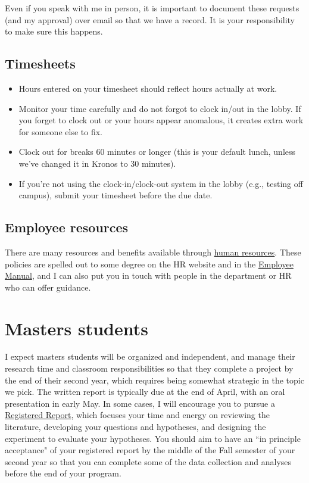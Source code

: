 \documentclass[letterpaper,12pt,oneside]{memoir}
\begin{document}
\begin{shaded}
\noindent Even if you speak with me in person, it is important to document these requests (and my approval) over email so that we have a record. It is your responsibility to make sure this happens.
\end{shaded}

\subsection{Timesheets}

\begin{itemize}
\item Hours entered on your timesheet should reflect hours actually at work.
\item Monitor your time carefully and do not forgot to clock in/out in the lobby. If you forget to clock out or your hours appear anomalous, it creates extra work for someone else to fix. 
\item Clock out for breaks 60 minutes or longer (this is your default lunch, unless we've changed it in Kronos to 30 minutes).
\item If you're not using the clock-in/clock-out system in the lobby (e.g., testing off campus), submit your timesheet before the due date.
\end{itemize}


\subsection{Employee resources}

There are many resources and benefits available through \href{https://www.temple.edu/faculty-and-staff/working-temple/human-resources}{human resources}. These policies are spelled out to some degree on the HR website and in the \href{http://www.temple.edu/hr/departments/employeerelations/documents/Employee_Manual_Feb_2016.pdf}{Employee Manual}, and I can also put you in touch with people in the department or HR who can offer guidance.

\section{Masters students}
I expect masters students will be organized and independent, and manage their research time and classroom responsibilities so that they complete a project by the end of their second year, which requires being somewhat strategic in the topic we pick. The written report is typically due at the end of April, with an oral presentation in early May. In some cases, I will encourage you to pursue a \href{https://cos.io/rr/}{Registered Report}, which focuses your time and energy on reviewing the literature, developing your questions and hypotheses, and designing the experiment to evaluate your hypotheses. You should aim to have an ``in principle acceptance" of your registered report by the middle of the Fall semester of your second year so that you can complete some of the data collection and analyses before the end of your program.
\end{document}
